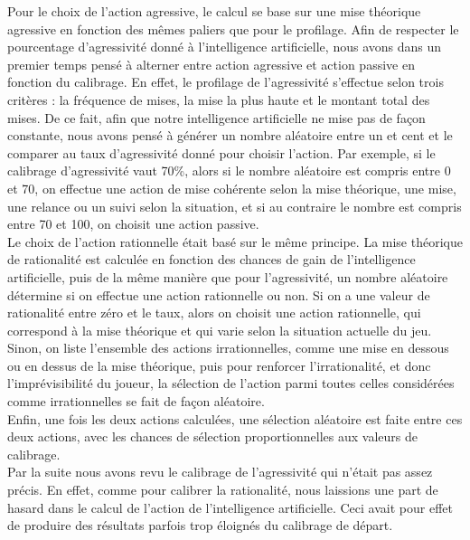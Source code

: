 \documentclass{report}
\begin{document}
Pour le choix de l'action agressive, le calcul se base sur une mise théorique agressive en fonction des mêmes paliers que pour le profilage. Afin de respecter le pourcentage d'agressivité donné à l'intelligence artificielle, nous avons dans un premier temps pensé à alterner entre action agressive et action passive en fonction du calibrage. En effet, le profilage de l'agressivité s'effectue selon trois critères : la fréquence de mises, la mise la plus haute et le montant total des mises. De ce fait, afin que notre intelligence artificielle ne mise pas de façon constante, nous avons pensé à générer un nombre aléatoire entre un et cent et le comparer au taux d'agressivité donné pour choisir l'action. Par exemple, si le calibrage d'agressivité vaut 70\%, alors si le nombre aléatoire est compris entre 0 et 70, on effectue une action de mise cohérente selon la mise théorique, une mise, une relance ou un suivi selon la situation, et si au contraire le nombre est compris entre 70 et 100, on choisit une action passive.\\

Le choix de l'action rationnelle était basé sur le même principe. La mise théorique de rationalité est calculée en fonction des chances de gain de l'intelligence artificielle, puis de la même manière que pour l'agressivité, un nombre aléatoire détermine si on effectue une action rationnelle ou non. Si on a une valeur de rationalité entre zéro et le taux, alors on choisit une action rationnelle, qui correspond à la mise théorique et qui varie selon la situation actuelle du jeu. Sinon, on liste l'ensemble des actions irrationnelles, comme une mise en dessous ou en dessus de la mise théorique, puis pour renforcer l’irrationalité, et donc l'imprévisibilité du joueur, la sélection de l'action parmi toutes celles considérées comme irrationnelles se fait de façon aléatoire.\\

Enfin, une fois les deux actions calculées, une sélection aléatoire est faite entre ces deux actions, avec les chances de sélection proportionnelles aux valeurs de calibrage.\\

Par la suite nous avons revu le calibrage de l'agressivité qui n'était pas assez précis. En effet, comme pour calibrer la rationalité, nous laissions une part de hasard dans le calcul de l'action de l'intelligence artificielle. Ceci avait pour effet de produire des résultats parfois trop éloignés du calibrage de départ.\\
\end{document}
